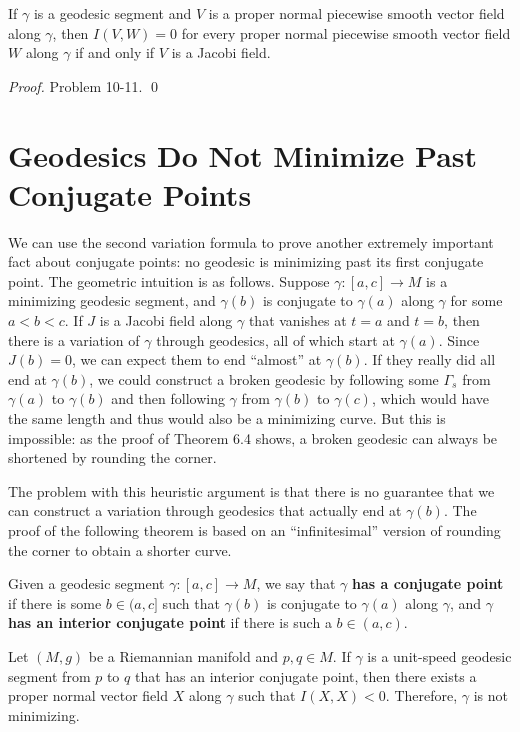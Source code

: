 \begin{corollary}\label{cor:jacobi-field-index-form}
If $\gamma$ is a geodesic segment and $V$ is a proper normal piecewise smooth vector field along $\gamma$, then $I(V, W) = 0$ for every proper normal piecewise smooth vector field $W$ along $\gamma$ if and only if $V$ is a Jacobi field.

\textit{Proof.} Problem 10-11. \qed
\end{corollary}

\section{Geodesics Do Not Minimize Past Conjugate Points}

We can use the second variation formula to prove another extremely important fact
about conjugate points: no geodesic is minimizing past its first conjugate point. The
geometric intuition is as follows. Suppose $\gamma : [a, c] \to M$ is a minimizing geodesic
segment, and $\gamma(b)$ is conjugate to $\gamma(a)$ along $\gamma$ for some $a < b < c$. If $J$ is a Jacobi
field along $\gamma$ that vanishes at $t = a$ and $t = b$, then there is a variation of $\gamma$ through
geodesics, all of which start at $\gamma(a)$. Since $J(b) = 0$, we can expect them to end
``almost'' at $\gamma(b)$. If they really did all end at $\gamma(b)$, we could construct a broken
geodesic by following some $\Gamma_s$ from $\gamma(a)$ to $\gamma(b)$ and then following $\gamma$ from $\gamma(b)$
to $\gamma(c)$, which would have the same length and thus would also be a minimizing
curve. But this is impossible: as the proof of Theorem 6.4 shows, a broken geodesic
can always be shortened by rounding the corner.

The problem with this heuristic argument is that there is no guarantee that we
can construct a variation through geodesics that actually end at $\gamma(b)$. The proof of
the following theorem is based on an ``infinitesimal'' version of rounding the corner
to obtain a shorter curve.

Given a geodesic segment $\gamma : [a, c] \to M$, we say that $\gamma$ \textbf{has a conjugate point}
if there is some $b \in (a, c]$ such that $\gamma(b)$ is conjugate to $\gamma(a)$ along $\gamma$, and $\gamma$ \textbf{has an
interior conjugate point} if there is such a $b \in (a, c)$.

\begin{theorem}
\label{thm:no-minimize-past-conjugate}
Let $(M, g)$ be a Riemannian manifold and $p, q \in M$. If $\gamma$ is a unit-speed geodesic segment from $p$ to $q$ that has an interior conjugate point, then there exists a proper normal vector field $X$ along $\gamma$ such that $I(X, X) < 0$. Therefore, $\gamma$ is not minimizing.
\end{theorem}


